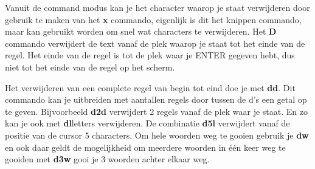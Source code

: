 Vanuit de command modus kan je het character waarop je staat verwijderen door gebruik te maken van het \textbf{x} commando, eigenlijk is dit het knippen commando, maar kan gebruikt worden om snel wat characters te verwijderen. Het \textbf{D} commando verwijdert de text vanaf de plek waarop je staat tot het einde van de regel. Het einde van de regel is tot de plek waar je \textsc{ENTER} gegeven hebt, dus niet tot het einde van de regel op het scherm.

Het verwijderen van een complete regel van begin tot eind doe je met \textbf{dd}. Dit commando kan je uitbreiden met aantallen regels door tussen de d's een getal op te geven. Bijvoorbeeld \textbf{d2d} verwijdert 2 regels vanaf de plek waar je staat. En zo kan je ook met \textbf{dl}letters verwijderen. De combinatie \textbf{d5l} verwijdert vanaf de positie van de cursor 5 characters. Om hele woorden weg te gooien gebruik je \textbf{dw} en ook daar geldt de mogelijkheid om meerdere woorden in \'e\'en keer weg te gooiden met \textbf{d3w} gooi je 3 woorden achter elkaar weg.
